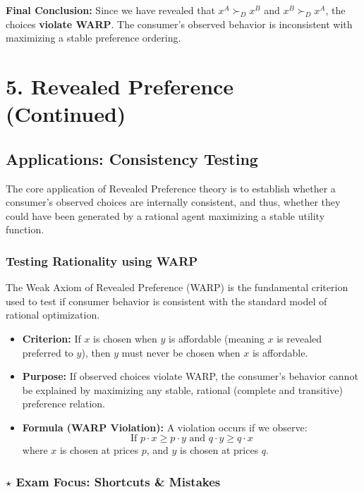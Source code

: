 \documentclass{article}
\begin{document}
\textbf{Final Conclusion:} Since we have revealed that $x^A \succ_D x^B$ and $x^B \succ_D x^A$, the choices \textbf{violate WARP}. The consumer's observed behavior is inconsistent with maximizing a stable preference ordering.

\hrulefill

\section*{5. Revealed Preference (Continued)}

\subsection*{Applications: Consistency Testing}

The core application of Revealed Preference theory is to establish whether a consumer's observed choices are internally consistent, and thus, whether they could have been generated by a rational agent maximizing a stable utility function.

\subsubsection*{Testing Rationality using WARP}

The Weak Axiom of Revealed Preference (WARP) is the fundamental criterion used to test if consumer behavior is consistent with the standard model of rational optimization.

\begin{itemize}
    \item \textbf{Criterion:} If $x$ is chosen when $y$ is affordable (meaning $x$ is revealed preferred to $y$), then $y$ must never be chosen when $x$ is affordable.
    \item \textbf{Purpose:} If observed choices violate WARP, the consumer's behavior cannot be explained by maximizing any stable, rational (complete and transitive) preference relation.
    \item \textbf{Formula (WARP Violation):} A violation occurs if we observe:
    \[\text{If } p \cdot x \geq p \cdot y \text{ and } q \cdot y \geq q \cdot x\]
    where $x$ is chosen at prices $p$, and $y$ is chosen at prices $q$.
\end{itemize}

\subsubsection*{$\star$ Exam Focus: Shortcuts \& Mistakes}
\end{document}
